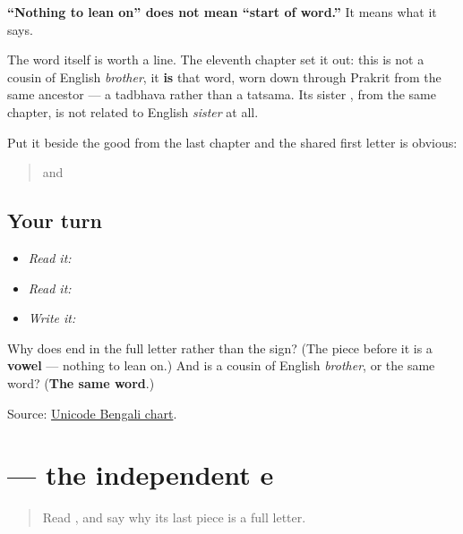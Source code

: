 \textbf{\textquotedblleft{}Nothing to lean on\textquotedblright{} does not mean \textquotedblleft{}start of word.\textquotedblright{}} It means what it says.

The word itself is worth a line. The eleventh chapter set it out: this is not a cousin of English \emph{brother}, it \textbf{is} that word, worn down through Prakrit from the same ancestor — a tadbhava rather than a tatsama. Its sister \textbf{}, from the same chapter, is not related to English \emph{sister} at all.

Put it beside the good from the last chapter and the shared first letter is obvious:

\begin{quote}
\textbf{} and \textbf{}
\end{quote}

\subsection*{Your turn}
\begin{itemize}
\raggedright
  \item \emph{Read it:} 
  \item \emph{Read it:}  
  \item \emph{Write it:} 
\end{itemize}

\begin{tcolorbox}[breakable,colback=teal!4,colframe=teal!35!black,title={Before you move on}]
Why does \textbf{} end in the full letter \textbf{} rather than the sign? (The piece before it is a \textbf{vowel} — nothing to lean on.) And is \textbf{} a cousin of English \emph{brother}, or the same word? (\textbf{The same word}.)

Source: \href{https://www.unicode.org/charts/PDF/U0980.pdf}{Unicode Bengali chart}.
\end{tcolorbox}
\section[e]{ — the independent e}

\label{lesson:BN-W04-e-indep}



\begin{quote}
Read \textbf{}, and say why its last piece is a full letter.
\end{quote}

